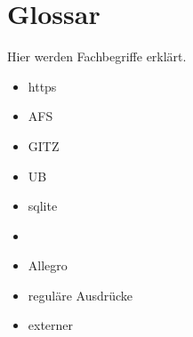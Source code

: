 
\chapter{Glossar}
Hier werden Fachbegriffe erklärt.
\begin{itemize}
  \item https
  \item AFS
  \item GITZ
  \item UB
  \item sqlite
  \item \BibTeX
  \item Allegro
  \item reguläre Ausdrücke
  \item externer
\end{itemize}
